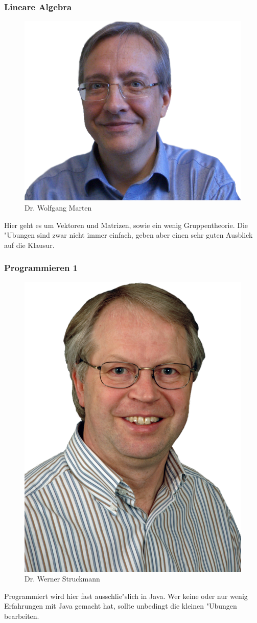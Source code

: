 \subsubsection{Lineare Algebra}

\begin{figure}[h]
	\centering\includegraphics[width=0.7\linewidth]{bilder/dozenten/marten_frei.png}\\
	{Dr. Wolfgang Marten}
\end{figure}
Hier geht es um Vektoren und Matrizen, sowie ein wenig Gruppentheorie. Die
"Ubungen sind zwar nicht immer einfach, geben aber einen sehr guten Ausblick auf die Klausur.


\subsubsection{Programmieren 1}

\begin{figure}[h]
	\centering\includegraphics[width=0.7\linewidth]{bilder/dozenten/struck.png}\\
	{Dr. Werner Struckmann}
\end{figure}
Programmiert wird hier fast ausschlie"slich in Java. Wer keine oder nur wenig Erfahrungen mit Java gemacht hat, sollte unbedingt die kleinen "Ubungen bearbeiten.


